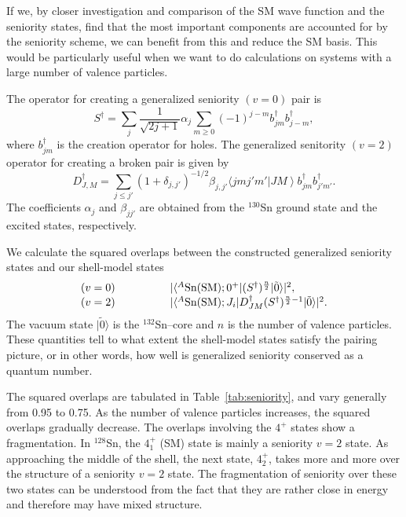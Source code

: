 \documentclass[rmp,aps,floatfix]{revtex4}
\begin{document}
If we, by closer investigation and comparison of the SM wave function and the
seniority states, find that the most important components are accounted for  
by the seniority scheme, we can benefit from this and reduce the SM basis. 
This would be particularly useful when we want to do calculations on systems 
with a large number of valence particles.

The operator for creating a generalized seniority $(v=0)$ pair is
\begin{equation}
    S^{\dagger}= \sum_{j} 
    \frac{1}{\sqrt{2j+1}}\alpha_{j}\sum_{m \geq 0} (-1)^{j-m} b^{\dagger}_{jm}
    b_{j-m}^{\dagger},
    \label{eq:s_dagger}
\end{equation}
where  $b^{\dagger}_{jm}$ is the creation operator for holes.
The generalized senitority $(v=2)$ operator for creating a broken pair 
is given by
\begin{equation}
     D_{J,M}^{\dagger}=
     \sum_{j \leq j'} (1+\delta_{j,j'})^{-1/2}
     \beta_{j,j'} \langle j m j' m'
     \left | JM \right \rangle b^{\dagger}_{jm}b^{\dagger}_{j'm'}.
\end{equation}
The coefficients $\alpha_{j}$ and $\beta_{jj'}$ are obtained from the $^{130}$Sn
ground state and the excited states, respectively.

We calculate the squared overlaps between the constructed generalized seniority
states and our shell-model states
\begin{equation}
\begin{array}{lccccl}
(v=0) & & & & &
|\langle ^{A}{\rm Sn(SM)} ;
0^{+}|(S^{\dagger})^{\frac{n}{2}}| \tilde{0} \rangle |^{2}, \\
(v=2) & & & & &
|\langle ^{A}{\rm Sn(SM)} ;
J_{i}|D^{\dagger}_{JM}(S^{\dagger})^{\frac{n}{2}-1}| \tilde{0} \rangle |^{2}. 
\end{array}
\end{equation}
The vacuum state $|\tilde{0} \rangle $ is the $^{132}$Sn--core and $n$ is
the number of valence particles. These quantities tell to what extent the 
shell-model states satisfy the pairing picture, or in other words, how well 
is generalized seniority conserved as a quantum number.

The squared overlaps are tabulated in Table~\ref{tab:seniority}, and vary
generally from 0.95 to 0.75. As the number of valence particles increases, the 
squared overlaps gradually decrease. The overlaps involving the $4^{+}$
states show a fragmentation. In $^{128}$Sn, the $4^{+}_{1}$ (SM)
state is mainly a seniority $v=2$ state. As approaching the middle of the 
shell, the next state, $4^{+}_{2}$, takes more and more over the 
structure of a seniority $v=2$ state. The fragmentation of seniority over these
two states can be understood from the fact that they are rather close in 
energy and therefore may have mixed structure.
\end{document}
